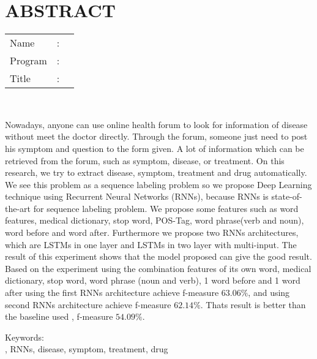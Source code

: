 %
%
%

\chapter*{ABSTRACT}

\vspace*{0.2cm}

\noindent \begin{tabular}{l l p{11.0cm}}
	Name&: & \penulis \\
	Program&: & \programEng \\
	Title&: & \judulInggris \\
\end{tabular} \\ 

\vspace*{0.5cm}

\noindent 

Nowadays, anyone can use online health forum to look for information of disease without meet the doctor directly. Through the forum, someone just need to post his symptom and question to the form given. A lot of information which can be retrieved from the forum, such as symptom, disease, or treatment. On this research, we try to extract disease, symptom, treatment and drug automatically. We see this problem as a sequence labeling problem so we propose Deep Learning technique using Recurrent Neural Networks (RNNs), because RNNs is state-of-the-art for sequence labeling problem. We propose some features such as word features, medical dictionary, stop word, POS-Tag, word phrase(verb and noun), word before and word after. Furthermore we propose two RNNs architectures, which are LSTMs in one layer and LSTMs in two layer with multi-input. The result of this experiment shows that the model proposed can give the good result. Based on the experiment using the combination features of its own word, medical dictionary, stop word, word phrase (noun and verb), 1 word before and 1 word after using the first RNNs architecture achieve f-measure $ 63.06\% $, and using second RNNs architecture achieve f-measure $ 62.14\% $. Thats result is better than the baseline used \citep{skripsiKakRadit}, f-measure $ 54.09\% $.


\vspace*{0.2cm}

\noindent Keywords: \\ 
\noindent \mer, RNNs, disease, symptom, treatment, drug \\ 

\newpage